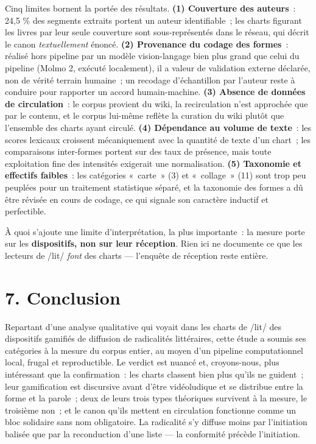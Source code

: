 \documentclass[11pt,a4paper]{article}
\begin{document}
Cinq limites bornent la portée des résultats. \textbf{(1) Couverture des auteurs}~: 24,5 \% des segments extraits portent un auteur identifiable~; les charts figurant les livres par leur seule couverture sont sous-représentés dans le réseau, qui décrit le canon \emph{textuellement} énoncé. \textbf{(2) Provenance du codage des formes}~: réalisé hors pipeline par un modèle vision-langage bien plus grand que celui du pipeline (Molmo 2, exécuté localement), il a valeur de validation externe déclarée, non de vérité terrain humaine~; un recodage d'échantillon par l'auteur reste à conduire pour rapporter un accord humain-machine. \textbf{(3) Absence de données de circulation}~: le corpus provient du wiki, la recirculation n'est approchée que par le contenu, et le corpus lui-même reflète la curation du wiki plutôt que l'ensemble des charts ayant circulé. \textbf{(4) Dépendance au volume de texte}~: les scores lexicaux croissent mécaniquement avec la quantité de texte d'un chart~; les comparaisons inter-formes portent sur des taux de présence, mais toute exploitation fine des intensités exigerait une normalisation. \textbf{(5) Taxonomie et effectifs faibles}~: les catégories «~carte~» (3) et «~collage~» (11) sont trop peu peuplées pour un traitement statistique séparé, et la taxonomie des formes a dû être révisée en cours de codage, ce qui signale son caractère inductif et perfectible.

À quoi s'ajoute une limite d'interprétation, la plus importante~: la mesure porte sur les \textbf{dispositifs, non sur leur réception}. Rien ici ne documente ce que les lecteurs de /lit/ \emph{font} des charts --- l'enquête de réception reste entière.

\section*{7. Conclusion}

Repartant d'une analyse qualitative qui voyait dans les charts de /lit/ des dispositifs gamifiés de diffusion de radicalités littéraires, cette étude a soumis ses catégories à la mesure du corpus entier, au moyen d'un pipeline computationnel local, frugal et reproductible. Le verdict est nuancé et, croyons-nous, plus intéressant que la confirmation~: les charts classent bien plus qu'ils ne guident~; leur gamification est discursive avant d'être vidéoludique et se distribue entre la forme et la parole~; deux de leurs trois types théoriques survivent à la mesure, le troisième non~; et le canon qu'ils mettent en circulation fonctionne comme un bloc solidaire sans nom obligatoire. La radicalité s'y diffuse moins par l'initiation balisée que par la reconduction d'une liste --- la conformité précède l'initiation.
\end{document}
